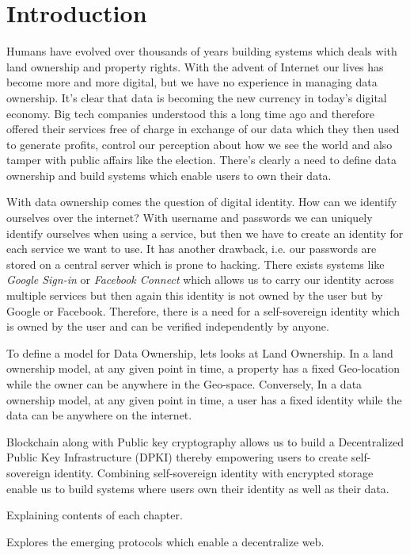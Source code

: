 \chapter{Introduction}\label{chapter::introduction}
Humans have evolved over thousands of years building systems which deals with land ownership and property rights. With the advent of Internet our lives has become more and more digital, but we have no experience in managing data ownership. It's clear that data is becoming the new currency in today's digital economy. Big tech companies understood this a long time ago and therefore offered their services free of charge in exchange of our data which they then used to generate profits, control our perception about how we see the world and also tamper with public affairs like the election. There's clearly a need to define data ownership and build systems which enable users to own their data.

With data ownership comes the question of digital identity. How can we identify ourselves over the internet? With username and passwords we can uniquely identify ourselves when using a service, but then we have to create an identity for each service we want to use. It has another drawback, i.e. our passwords are stored on a central server which is prone to hacking. There exists systems like \textit{Google Sign-in} or \textit{Facebook Connect} which allows us to carry our identity across multiple services but then again this identity is not owned by the user but by Google or Facebook. Therefore, there is a need for a self-sovereign identity which is owned by the user and can be verified independently by anyone.

To define a model for Data Ownership, lets looks at Land Ownership. In a land ownership model, at any given point in time, a property has a fixed Geo-location while the owner can be anywhere in the Geo-space. Conversely, In a data ownership model, at any given point in time, a user has a fixed identity while the data can be anywhere on the internet.

Blockchain along with Public key cryptography allows us to build a Decentralized Public Key Infrastructure (DPKI) thereby empowering users to create self-sovereign identity. Combining self-sovereign identity with encrypted storage enable us to build systems where users own their identity as well as their data.

Explaining contents of each chapter.

Explores the emerging protocols which enable a decentralize web.
